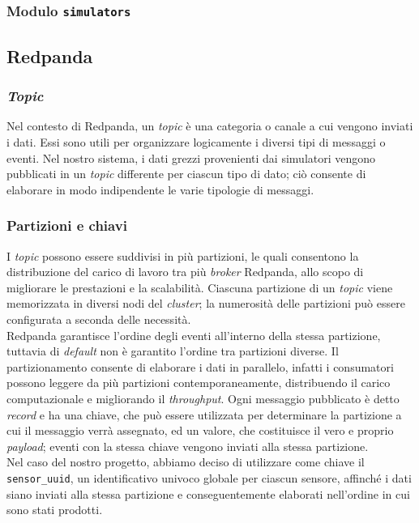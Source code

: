\subsubsection{Modulo \texttt{simulators}}

\subsection{Redpanda}
\subsubsection{\textit{Topic}}
Nel contesto di Redpanda, un \textit{topic} è una categoria o canale a cui vengono inviati i dati. Essi sono utili per
organizzare logicamente i diversi tipi di messaggi o eventi. Nel nostro sistema, i dati grezzi provenienti dai simulatori vengono pubblicati in un \textit{topic}
differente per ciascun tipo di dato; ciò consente di elaborare in modo indipendente le varie tipologie di messaggi.

\subsubsection{Partizioni e chiavi}
I \textit{topic} possono essere suddivisi in più partizioni, le quali consentono la distribuzione del carico di lavoro tra più \textit{broker} Redpanda,
allo scopo di migliorare le prestazioni e la scalabilità. Ciascuna partizione di un \textit{topic} viene memorizzata in diversi nodi del \textit{cluster}; la numerosità
delle partizioni può essere configurata a seconda delle necessità.\\
Redpanda garantisce l'ordine degli eventi all'interno della stessa partizione, tuttavia di \textit{default} non è garantito l'ordine tra partizioni diverse.
Il partizionamento consente di elaborare i dati in parallelo, infatti i consumatori possono leggere da più partizioni contemporaneamente, distribuendo il carico computazionale e migliorando il \textit{throughput}.
Ogni messaggio pubblicato è detto \textit{record} e ha una chiave, che può essere utilizzata per determinare la partizione a cui il messaggio verrà assegnato, ed un valore,
che costituisce il vero e proprio \textit{payload}; eventi con la stessa chiave vengono inviati alla stessa partizione.\\
Nel caso del nostro progetto, abbiamo deciso di utilizzare come chiave il \texttt{sensor\_uuid}, un identificativo univoco globale per ciascun sensore, affinché i dati
siano inviati alla stessa partizione e conseguentemente elaborati nell'ordine in cui sono stati prodotti.

